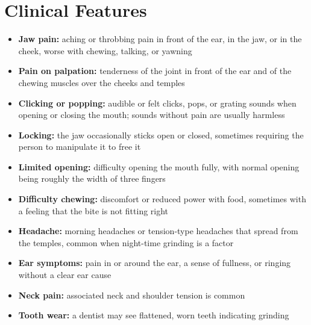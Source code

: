 \section*{Clinical Features}
\begin{itemize}
    \item \textbf{Jaw pain:} aching or throbbing pain in front of the ear, in the jaw, or in the cheek, worse with chewing, talking, or yawning
    \item \textbf{Pain on palpation:} tenderness of the joint in front of the ear and of the chewing muscles over the cheeks and temples
    \item \textbf{Clicking or popping:} audible or felt clicks, pops, or grating sounds when opening or closing the mouth; sounds without pain are usually harmless
    \item \textbf{Locking:} the jaw occasionally sticks open or closed, sometimes requiring the person to manipulate it to free it
    \item \textbf{Limited opening:} difficulty opening the mouth fully, with normal opening being roughly the width of three fingers
    \item \textbf{Difficulty chewing:} discomfort or reduced power with food, sometimes with a feeling that the bite is not fitting right
    \item \textbf{Headache:} morning headaches or tension-type headaches that spread from the temples, common when night-time grinding is a factor
    \item \textbf{Ear symptoms:} pain in or around the ear, a sense of fullness, or ringing without a clear ear cause
    \item \textbf{Neck pain:} associated neck and shoulder tension is common
    \item \textbf{Tooth wear:} a dentist may see flattened, worn teeth indicating grinding
\end{itemize}

